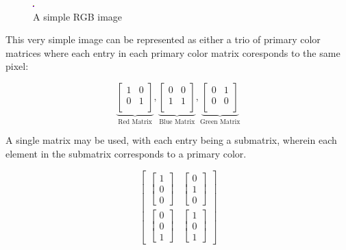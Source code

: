 \documentclass[10pt]{report}
\begin{document}
    \begin{figure}[ht]
        \centering
        \includegraphics[scale=40]{./img/sqr.png}
        \caption{A simple RGB image}
        \label{fig:example}
    \end{figure}

This very simple image can be represented as either a trio of primary color matrices where each entry in each primary color matrix coresponds to the same pixel:

    \[
    \underbrace{
    \begin{bmatrix}
        1&0\\
        0&1\\
    \end{bmatrix}
    }_{\text{Red Matrix}}
    ,
    \underbrace{
    \begin{bmatrix}
        0&0\\
        1&1\\
    \end{bmatrix}
    }_{\text{Blue Matrix}}
    ,
    \underbrace{
    \begin{bmatrix}
        0&1\\
        0&0\\
    \end{bmatrix}
    }_{\text{Green Matrix}}
    \]

A single matrix may be used, with each entry being a submatrix, wherein each element in the submatrix corresponds to a primary color.

  \[
    \begin{bmatrix}
        \begin{bmatrix}1\\0\\0\end{bmatrix} &
        \begin{bmatrix}0\\1\\0\end{bmatrix}\\[2em]
        \begin{bmatrix}0\\0\\1\end{bmatrix} &
        \begin{bmatrix}1\\0\\1\end{bmatrix}
    \end{bmatrix}
  \]
\end{document}
